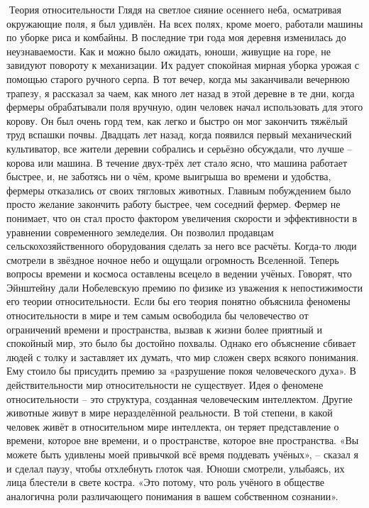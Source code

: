 \documentclass[a4paper]{book}
\begin{document}
Теория относительности
Глядя на светлое сияние осеннего неба, осматривая окружающие поля, я был удивлён.
На всех полях, кроме моего, работали машины по уборке риса и комбайны. В последние три
года моя деревня изменилась до неузнаваемости.
Как и можно было ожидать, юноши, живущие на горе, не завидуют повороту к
механизации. Их радует спокойная мирная уборка урожая с помощью старого ручного серпа.
В тот вечер, когда мы заканчивали вечернюю трапезу, я рассказал за чаем, как много лет
назад в этой деревне в те дни, когда фермеры обрабатывали поля вручную, один человек
начал использовать для этого корову. Он был очень горд тем, как легко и быстро он мог
закончить тяжёлый труд вспашки почвы. Двадцать лет назад, когда появился первый
механический культиватор, все жители деревни собрались и серьёзно обсуждали, что
лучше – корова или машина. В течение двух-трёх лет стало ясно, что машина работает
быстрее, и, не заботясь ни о чём, кроме выигрыша во времени и удобства, фермеры
отказались от своих тягловых животных. Главным побуждением было просто желание
закончить работу быстрее, чем соседний фермер.
Фермер не понимает, что он стал просто фактором увеличения скорости и
эффективности в уравнении современного земледелия. Он позволил продавцам
сельскохозяйственного оборудования сделать за него все расчёты.
Когда-то люди смотрели в звёздное ночное небо и ощущали огромность Вселенной.
Теперь вопросы времени и космоса оставлены всецело в ведении учёных.
Говорят, что Эйнштейну дали Нобелевскую премию по физике из уважения к
непостижимости его теории относительности. Если бы его теория понятно объяснила
феномены относительности в мире и тем самым освободила бы человечество от
ограничений времени и пространства, вызвав к жизни более приятный и спокойный мир, это
было бы достойно похвалы. Однако его объяснение сбивает людей с толку и заставляет их
думать, что мир сложен сверх всякого понимания. Ему стоило бы присудить премию за
«разрушение покоя человеческого духа».
В действительности мир относительности не существует. Идея о феномене
относительности – это структура, созданная человеческим интеллектом. Другие животные
живут в мире неразделённой реальности. В той степени, в какой человек живёт в
относительном мире интеллекта, он теряет представление о времени, которое вне времени,
и о пространстве, которое вне пространства.
«Вы можете быть удивлены моей привычкой всё время поддевать учёных», – сказал я и
сделал паузу, чтобы отхлебнуть глоток чая. Юноши смотрели, улыбаясь, их лица блестели в
свете костра. «Это потому, что роль учёного в обществе аналогична роли различающего
понимания в вашем собственном сознании».
\end{document}
